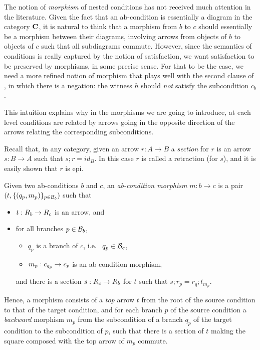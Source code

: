 The notion of \emph{morphism} of nested conditions has not received much attention in the literature. Given the fact that an ab-condition is essentially a diagram in the category $\mathbf{C}$, it is natural to think that a morphism from $b$ to $c$ should essentially be a morphism between their diagrams, involving arrows from objects of $b$ to objects of $c$ such that all subdiagrams commute. However, since the semantics of conditions is really captured by the notion of satisfaction, we want satisfaction to be preserved by morphisms, in some precise sense. For that to be the case, we need a more refined notion of morphism that plays well with the second clause of , in which there is a negation: the witness $h$ should \emph{not} satisfy the subcondition $c_b$. 

This intuition explains why in the morphisms we are going to introduce, at each level conditions are related by arrows going in the opposite direction of the arrows relating the corresponding subconditions.  

Recall that, in any category, given an arrow $r: A \to B$ a \emph{section} for $r$ is an arrow $s: B \to A$ such that $s;r = id_B$. In this case $r$ is called a retraction (for $s$), and it is easily shown that $r$ is epi.

\begin{definition}
  Given two ab-conditions $b$ and $c$, an \emph{ab-condition morphism} $m: b \to c$
  is a pair $(t,\{{(q_p,m_p)}\}_{p\in \mathcal{B}_b})$ such that   
  \begin{itemize}
    \item $t:R_b\rightarrow R_c$ is an arrow, and  
  \item  for all branches $p\in \mathcal{B}_b$, 
  \begin{itemize}
    \item $q_p$ is a branch of $c$, i.e.~ $q_p \in \mathcal{B}_c$,
    \item $m_p:c_{q_p}\rightarrow c_p$ is an ab-condition morphism,
  \end{itemize}
    
    and there is a section $s:R_c\rightarrow R_b$ for $t$ such that $s; r_p = r_q;t_{m_p}$.
  
\end{itemize}
\end{definition}
%
Hence, a morphism consists of a \emph{top} arrow $t$ from the root of the source condition to that of the target condition, and for each branch $p$ of the source condition a \emph{backward} morphism $m_p$ from the subcondition of a branch $q_p$ of the target condition to the subcondition of $p$, such that there is a section of $t$ making the square composed with the top arrow of $m_p$ commute. 

